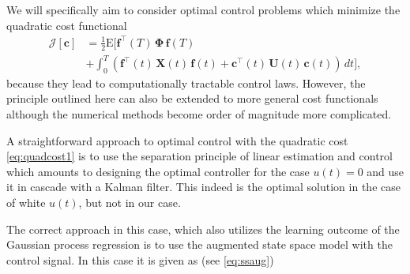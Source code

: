 \documentclass[journal]{IEEEtran}
\begin{document}
We will specifically aim to consider optimal control problems which minimize the quadratic cost functional
%
\begin{equation}
\begin{split}
  \mathcal{J}[\mathbf{c}] &= \frac{1}{2} \mathrm{E} \Big[
    \mathbf{f}^{\top}(T) \, \boldsymbol{\Phi} \, \mathbf{f}(T) \\
   &+ \int_0^T
   (\mathbf{f}^{\top}(t) \, \mathbf{X}(t) \, \mathbf{f}(t)
  + \mathbf{c}^{\top}(t) \, \mathbf{U}(t) \, \mathbf{c}(t)) \, dt \Big],
\end{split}
\label{eq:quadcost1}
\end{equation}
%
because they lead to computationally tractable control laws. However, the principle outlined here can also be extended to more general cost functionals although the numerical methods become order of magnitude more complicated.

A straightforward approach to optimal control with the quadratic cost \eqref{eq:quadcost1} is to use the separation principle of linear estimation and control which amounts to designing the optimal controller for the case $u(t) = 0$ and use it in cascade with a Kalman filter. This indeed is the optimal solution in the case of white $u(t)$, but not in our case.

The correct approach in this case, which also utilizes the learning outcome of the Gaussian process regression is to use the augmented state space model with the control signal. In this case it is given as (see \eqref{eq:ssaug})
\end{document}
